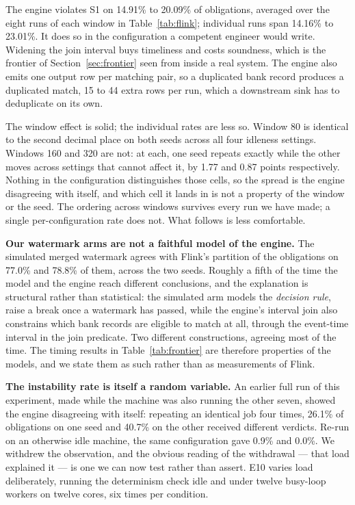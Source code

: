 \documentclass[10pt,conference]{IEEEtran}
\begin{document}
The engine violates S1 on 14.91\% to 20.09\% of obligations, averaged over the
eight runs of each window in Table~\ref{tab:flink}; individual runs span
14.16\% to 23.01\%. It does so in the configuration a competent engineer would
write.
Widening the join interval buys timeliness and costs soundness, which is the
frontier of Section~\ref{sec:frontier} seen from inside a real system. The
engine also emits one output row per matching pair, so a duplicated bank record produces a duplicated match, 15 to 44 extra rows
per run, which a downstream sink has to deduplicate on its own.

The window effect is solid; the individual rates are less so. Window 80 is
identical to the second decimal place on both seeds across all four idleness
settings. Windows 160 and 320 are not: at each, one seed repeats exactly while
the other moves across settings that cannot affect it, by 1.77 and 0.87 points
respectively. Nothing in the configuration distinguishes those cells, so the
spread is the engine disagreeing with itself, and which cell it lands in is not
a property of the window or the seed. The ordering across windows survives
every run we have made; a single per-configuration rate does not. What follows
is less comfortable.

\textbf{Our watermark arms are not a faithful model of the engine.} The
simulated merged watermark agrees with Flink's partition of the obligations on
77.0\% and 78.8\% of them, across the two seeds. Roughly a fifth of the time the
model and the engine reach different conclusions, and the explanation is
structural rather than statistical: the simulated arm models the \emph{decision rule}, raise a break once a watermark
has passed, while the engine's interval join also constrains which bank records are eligible to match at all, through
the event-time interval in the join predicate. Two different constructions,
agreeing most of the time. The timing results in Table~\ref{tab:frontier} are
therefore properties of the models, and we state them as such rather than as
measurements of Flink.

\textbf{The instability rate is itself a random variable.} An earlier full run
of this experiment, made while the machine was also running the other seven,
showed the engine disagreeing with itself: repeating an identical job four
times, 26.1\% of obligations on one seed and 40.7\% on the other received
different verdicts. Re-run on an otherwise idle machine, the same configuration
gave 0.9\% and 0.0\%. We withdrew the observation, and the obvious reading of
the withdrawal --- that load explained it --- is one we can now test rather than
assert. E10 varies load deliberately, running the determinism check idle and
under twelve busy-loop workers on twelve cores, six times per condition.
\end{document}
